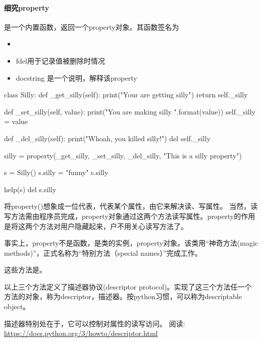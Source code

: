 \paragraph{细究property}

是一个内置函数，返回一个property对象。其函数签名为

\begin{itemize}
\item {}
\item fdel用于记录值被删除时情况
\item docstring 是一个说明，解释该property
\end{itemize}


\begin{python}
class Silly:
    def _get_silly(self):
        print("Your are getting silly")
        return self._silly

    def _set_silly(self, value):
        print("You are making silly {}".format(value))
        self._silly = value

    def _del_silly(self):
        print("Whoah, you killed silly!")
        del self._silly

    silly = property(_get_silly, _set_silly, _del_silly, "This is a silly property")

s = Silly()
s.silly = "funny"
s.silly

help(s)
del s.silly
\end{python}

将property()想象成一位代表，代表某个属性，由它来解决读、写属性。
当然，读写方法需由程序员完成，property对象通过这两个方法读写属性。property的作用是将这两个方法对用户隐藏起来，户不用关心读写方法了。

事实上，property不是函数，是类的实例，property对象。该类用“神奇方法(magic methods)”，正式名称为“特别方法（special names）”完成工作。

这些方法是。

以上三个方法定义了描述器协议(descriptor protocol)。实现了这三个方法任一个方法的对象，称为descriptor，描述器。按python习惯，可以称为descriptable object。

描述器特别处在于，它可以控制对属性的读写访问。
阅读: \url{https://docs.python.org/3/howto/descriptor.html}

